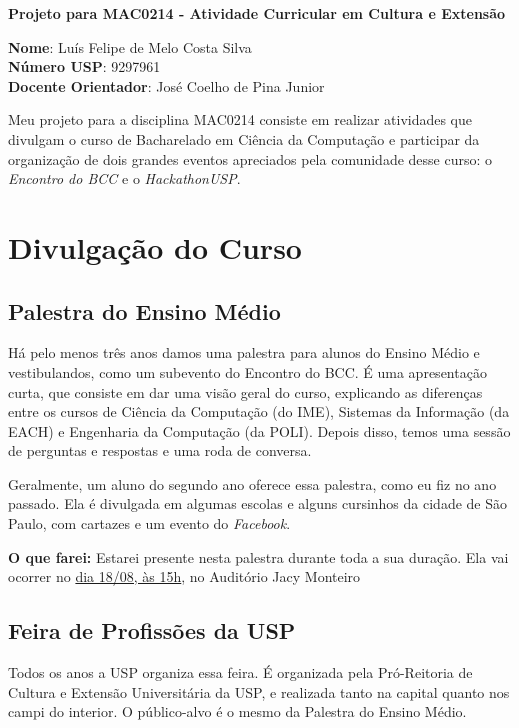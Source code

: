 \documentclass[12pt,letterpaper]{article}
\begin{document}
	
	\begin{center}
		\LARGE \bf
		Projeto para MAC0214 - Atividade Curricular em Cultura e Extensão
	\end{center}
	
	\large \textbf{Nome}: Luís Felipe de Melo Costa Silva \\
	\textbf{Número USP}: 9297961 \\
	\large \textbf{Docente Orientador}: José Coelho de Pina Junior
	
	Meu projeto para a disciplina MAC0214 consiste em realizar atividades que divulgam o curso de Bacharelado em Ciência da Computação e participar da organização de dois grandes eventos apreciados pela comunidade desse curso: o \textit{Encontro do BCC} e o \textit{HackathonUSP}.
	
	\section{Divulgação do Curso}
	
	\subsection{Palestra do Ensino Médio}
	
	Há pelo menos três anos damos uma palestra para alunos do Ensino Médio e vestibulandos, como um subevento do Encontro do BCC. É uma apresentação curta, que consiste em dar uma visão geral do curso, explicando as diferenças entre os cursos de Ciência da Computação (do IME), Sistemas da Informação (da EACH) e Engenharia da Computação (da POLI). Depois disso, temos uma sessão de perguntas e respostas e uma roda de conversa. 
	
	Geralmente, um aluno do segundo ano oferece essa palestra, como eu fiz no ano passado. Ela é divulgada em algumas escolas e alguns cursinhos da cidade de São Paulo, com cartazes e um evento do \textit{Facebook}.
	
	\textbf{O que farei:} Estarei presente nesta palestra durante toda a sua duração. Ela vai ocorrer no \underline{dia 18/08, às 15h}, no Auditório Jacy Monteiro
	
	\subsection{Feira de Profissões da USP}
	
	Todos os anos a USP organiza essa feira. É organizada pela Pró-Reitoria de Cultura e Extensão Universitária da USP, e realizada tanto na capital quanto nos campi do interior. O público-alvo é o mesmo da Palestra do Ensino Médio.
	
\end{document}
